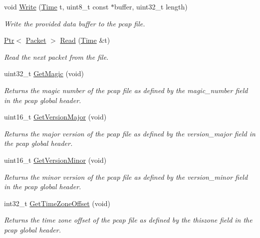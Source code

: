 \begin{DoxyCompactItemize}
void \hyperlink{classns3_1_1PcapFileWrapper_a1caef773ca7a9260db45dcc5911d08f3}{Write} (\hyperlink{classns3_1_1Time}{Time} t, uint8\+\_\+t const $\ast$buffer, uint32\+\_\+t length)
\begin{DoxyCompactList}\small\item\em Write the provided data buffer to the pcap file. \end{DoxyCompactList}\item 
\hyperlink{classns3_1_1Ptr}{Ptr}$<$ \hyperlink{classns3_1_1Packet}{Packet} $>$ \hyperlink{classns3_1_1PcapFileWrapper_a00109cbdbbf9dd2d3fb1856e660e355c}{Read} (\hyperlink{classns3_1_1Time}{Time} \&t)
\begin{DoxyCompactList}\small\item\em Read the next packet from the file. \end{DoxyCompactList}\item 
uint32\+\_\+t \hyperlink{classns3_1_1PcapFileWrapper_abb2104cf35129697f72a4d71f2e7d90b}{Get\+Magic} (void)
\begin{DoxyCompactList}\small\item\em Returns the magic number of the pcap file as defined by the magic\+\_\+number field in the pcap global header. \end{DoxyCompactList}\item 
uint16\+\_\+t \hyperlink{classns3_1_1PcapFileWrapper_a97f42f75bc1cf3885aee68a3088e7bf4}{Get\+Version\+Major} (void)
\begin{DoxyCompactList}\small\item\em Returns the major version of the pcap file as defined by the version\+\_\+major field in the pcap global header. \end{DoxyCompactList}\item 
uint16\+\_\+t \hyperlink{classns3_1_1PcapFileWrapper_aaccc49b53a2b5f2ec4239e63b9b05054}{Get\+Version\+Minor} (void)
\begin{DoxyCompactList}\small\item\em Returns the minor version of the pcap file as defined by the version\+\_\+minor field in the pcap global header. \end{DoxyCompactList}\item 
int32\+\_\+t \hyperlink{classns3_1_1PcapFileWrapper_ad819ceb3916fa74c16640d271e7eef1e}{Get\+Time\+Zone\+Offset} (void)
\begin{DoxyCompactList}\small\item\em Returns the time zone offset of the pcap file as defined by the thiszone field in the pcap global header. \end{DoxyCompactList}\item 

\end{DoxyCompactItemize}
